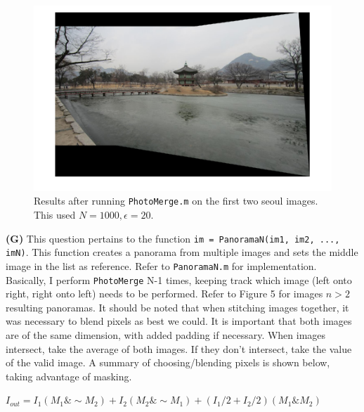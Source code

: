 \documentclass[12pt,twoside]{article}
\begin{document}
\begin{figure}[h]
  \begin{center}
    \includegraphics[width=.75\linewidth, trim= 0pt 20pt 0pt 20pt, clip]{pano_2.png}

  \end{center}
  \caption{Results after running \texttt{PhotoMerge.m} on the first two seoul images.  This used $N=1000, \epsilon=20$.}
  \label{fig:pipeline}
\end{figure}

\textbf{(G)} This question pertains to the function \texttt{im = PanoramaN({im1, im2, ..., imN})}. This function creates a panorama from multiple images and sets the middle image in the list as reference.  Refer to \texttt{PanoramaN.m} for implementation.  Basically, I perform \texttt{PhotoMerge} N-1 times, keeping track which image (left onto right, right onto left) needs to be performed.  Refer to Figure 5 for images $n>2$ resulting panoramas.  It should be noted that when stitching images together, it was necessary to blend pixels as best we could.  It is important that both images are of the same dimension, with added padding if necessary.  When images intersect, take the average of both images.  If they don't intersect, take the value of the valid image.  A summary of choosing/blending pixels is shown below, taking advantage of masking.\newline

$I_{out} = I_{1}(M_{1} \& \sim M_{2}) + I_{2}(M_{2} \& \sim M_{1}) + 
(I_{1}/2 + I_{2}/2)(M_{1} \& M_{2})$
\end{document}
